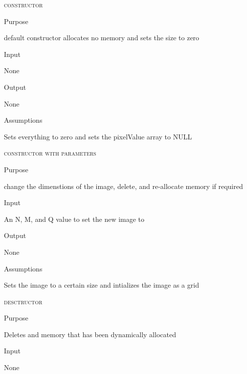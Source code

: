 \documentclass[pdftex, 11pt]{article}
\begin{document}
\begin{description}

	\item{\textsc{constructor}}
		\begin{description}
			\item{Purpose}

				default constructor allocates no memory and sets the size to zero 

			\item{Input}

				None

			\item{Output}

				None

			\item{Assumptions}

				Sets everything to zero and 
				sets the pixelValue array to NULL


		\end{description}


	\item{\textsc{constructor with parameters}}
		\begin{description}
			\item{Purpose}

				change the dimenstions of the image, delete,
				and re-allocate memory if required

			\item{Input}

				An N, M, and Q value to set the new image to

			\item{Output}

				None

			\item{Assumptions}

				Sets the image to a certain size and intializes the
				image as a grid

		\end{description}



	\item{\textsc{desctructor}}
		\begin{description}
			\item{Purpose}

				Deletes and memory that has been dynamically allocated

			\item{Input}

				None


\end{description}
\end{description}
\end{document}
